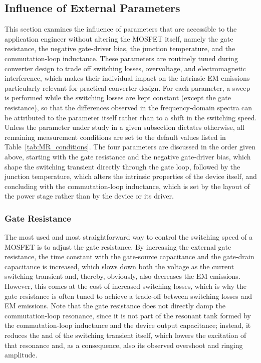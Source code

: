 \subsection{Influence of External Parameters}
\label{sec:MR_External}

This section examines the influence of parameters that are accessible to the application engineer without altering the MOSFET itself, namely the gate resistance, the negative gate-driver bias, the junction temperature, and the commutation-loop inductance.
These parameters are routinely tuned during converter design to trade off switching losses, overvoltage, and electromagnetic interference, which makes their individual impact on the intrinsic EM emissions particularly relevant for practical converter design.
For each parameter, a sweep is performed while the switching losses are kept constant (except the gate resistance), so that the differences observed in the frequency-domain spectra can be attributed to the parameter itself rather than to a shift in the switching speed.
Unless the parameter under study in a given subsection dictates otherwise, all remaining measurement conditions are set to the default values listed in Table~\ref{tab:MR_conditions}.
The four parameters are discussed in the order given above, starting with the gate resistance and the negative gate-driver bias, which shape the switching transient directly through the gate loop, followed by the junction temperature, which alters the intrinsic properties of the device itself, and concluding with the commutation-loop inductance, which is set by the layout of the power stage rather than by the device or its driver.

\subsubsection*{Gate Resistance}

The most used and most straightforward way to control the switching speed of a MOSFET is to adjust the gate resistance.
By increasing the external gate resistance, the time constant with the gate-source capacitance and the gate-drain capacitance is increased, which slows down both the voltage as the current switching transient and, thereby, obviously, also decreases the EM emissions.
However, this comes at the cost of increased switching losses, which is why the gate resistance is often tuned to achieve a trade-off between switching losses and EM emissions.
Note that the gate resistance does not directly damp the commutation-loop resonance, since it is not part of the resonant tank formed by the commutation-loop inductance and the device output capacitance; instead, it reduces the  and  of the switching transient itself, which lowers the excitation of that resonance and, as a consequence, also its observed overshoot and ringing amplitude.

